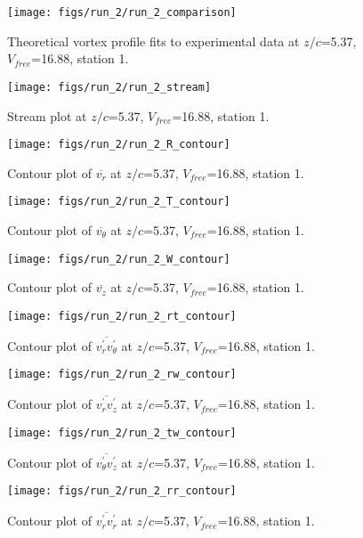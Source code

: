 \begin{figure}[H]
\centering
\texttt{[image: figs/run\_2/run\_2\_comparison]}
\caption{Theoretical vortex profile fits to experimental data at $z/c$=5.37, $V_{free}$=16.88, station 1.}
\end{figure}


\begin{figure}[H]
\centering
\texttt{[image: figs/run\_2/run\_2\_stream]}
\caption{Stream plot at $z/c$=5.37, $V_{free}$=16.88, station 1.}
\end{figure}


\begin{figure}[H]
\centering
\texttt{[image: figs/run\_2/run\_2\_R\_contour]}
\caption{Contour plot of $\overline{v_{r}}$ at $z/c$=5.37, $V_{free}$=16.88, station 1.}
\end{figure}


\begin{figure}[H]
\centering
\texttt{[image: figs/run\_2/run\_2\_T\_contour]}
\caption{Contour plot of $\overline{v_{\theta}}$ at $z/c$=5.37, $V_{free}$=16.88, station 1.}
\end{figure}


\begin{figure}[H]
\centering
\texttt{[image: figs/run\_2/run\_2\_W\_contour]}
\caption{Contour plot of $\overline{v_{z}}$ at $z/c$=5.37, $V_{free}$=16.88, station 1.}
\end{figure}


\begin{figure}[H]
\centering
\texttt{[image: figs/run\_2/run\_2\_rt\_contour]}
\caption{Contour plot of $\overline{v_{r}^{\prime} v_{\theta}^{\prime}}$ at $z/c$=5.37, $V_{free}$=16.88, station 1.}
\end{figure}


\begin{figure}[H]
\centering
\texttt{[image: figs/run\_2/run\_2\_rw\_contour]}
\caption{Contour plot of $\overline{v_{r}^{\prime} v_{z}^{\prime}}$ at $z/c$=5.37, $V_{free}$=16.88, station 1.}
\end{figure}


\begin{figure}[H]
\centering
\texttt{[image: figs/run\_2/run\_2\_tw\_contour]}
\caption{Contour plot of $\overline{v_{\theta}^{\prime} v_{z}^{\prime}}$ at $z/c$=5.37, $V_{free}$=16.88, station 1.}
\end{figure}


\begin{figure}[H]
\centering
\texttt{[image: figs/run\_2/run\_2\_rr\_contour]}
\caption{Contour plot of $\overline{v_{r}^{\prime} v_{r}^{\prime}}$ at $z/c$=5.37, $V_{free}$=16.88, station 1.}
\end{figure}


